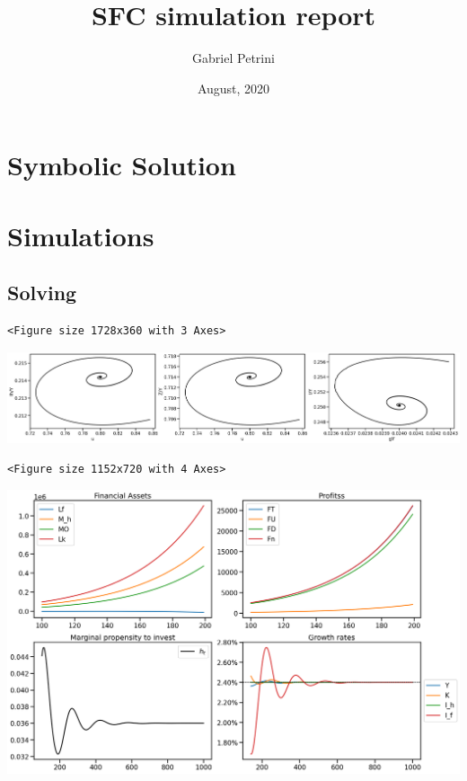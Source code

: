 \documentclass[11pt]{article}
\author{Gabriel Petrini}
\date{August, 2020}
\title{SFC simulation report}
\begin{document}
\maketitle
\tableofcontents


\section{Symbolic Solution}
\label{sec:org50c03a8}

\section{Simulations}
\label{sec:org701c32c}



\subsection{Solving}
\label{sec:org58bfd2c}

\begin{verbatim}
<Figure size 1728x360 with 3 Axes>
\end{verbatim}


\begin{center}
\includegraphics[width=.9\linewidth]{obipy-resources/833ba20b4aec1c9746a2e4fcac62a826eabb201d/edb75400eaa242706d333a5892dc23b807e4fa06.png}
\end{center}

\begin{verbatim}
<Figure size 1152x720 with 4 Axes>
\end{verbatim}


\begin{center}
\includegraphics[width=.9\linewidth]{obipy-resources/833ba20b4aec1c9746a2e4fcac62a826eabb201d/b1ab5d28b5a916ccd61a2da68541c183d68a4e01.png}
\end{center}
\end{document}
